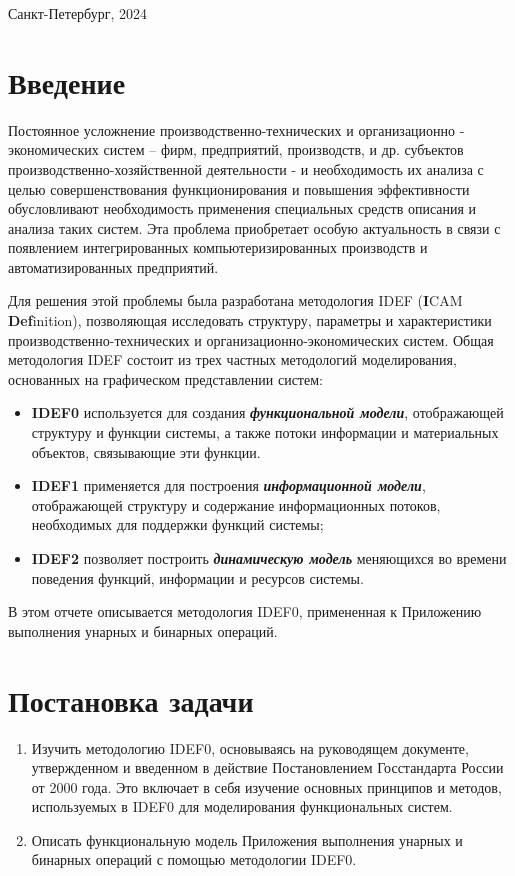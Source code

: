 \documentclass[a4paper, final]{article}
\begin{document}
\hfill \break
\hfill \break
\begin{center} \small{Санкт-Петербург, 2024} \end{center}
\thispagestyle{empty} %


\tableofcontents

\newpage

\section* {Введение}
Постоянное усложнение производственно-технических и организационно - экономических систем – фирм, предприятий, производств, и др. субъектов производственно-хозяйственной деятельности - и необходимость их анализа с целью совершенствования функционирования и повышения эффективности обусловливают необходимость применения специальных средств описания и анализа таких систем. Эта проблема приобретает особую актуальность в связи с появлением интегрированных компьютеризированных производств и автоматизированных предприятий.


Для решения этой проблемы была разработана методология IDEF (\textbf{I}CAM \textbf{Def}inition), позволяющая исследовать структуру, параметры и характеристики производственно-технических и организационно-экономических систем. Общая методология IDEF состоит из трех частных методологий моделирования, основанных на графическом представлении систем:
\begin{itemize}
	\item \textbf{IDEF0} используется для создания \textbf{\textit{функциональной модели}}, отображающей структуру и функции системы, а также потоки информации и материальных объектов, связывающие эти функции.
	\item \textbf{IDEF1} применяется для построения \textbf{\textit{информационной модели}}, отображающей структуру и содержание  информационных потоков, необходимых для поддержки функций системы;
	\item \textbf{IDEF2} позволяет построить \textit{\textbf{динамическую модель}} меняющихся во времени поведения функций, информации и ресурсов системы.
\end{itemize}

В этом отчете описывается методология IDEF0, примененная к Приложению выполнения унарных и бинарных операций. 

\newpage
\section{Постановка задачи} 
\begin{enumerate}
	\item Изучить методологию IDEF0, основываясь на руководящем документе, утвержденном и введенном в действие Постановлением Госстандарта России от 2000 года. Это включает в себя изучение основных принципов и методов, используемых в IDEF0 для моделирования функциональных систем.
	\item Описать функциональную модель Приложения выполнения унарных и бинарных операций с помощью методологии IDEF0.
\end{enumerate}
\end{document}
